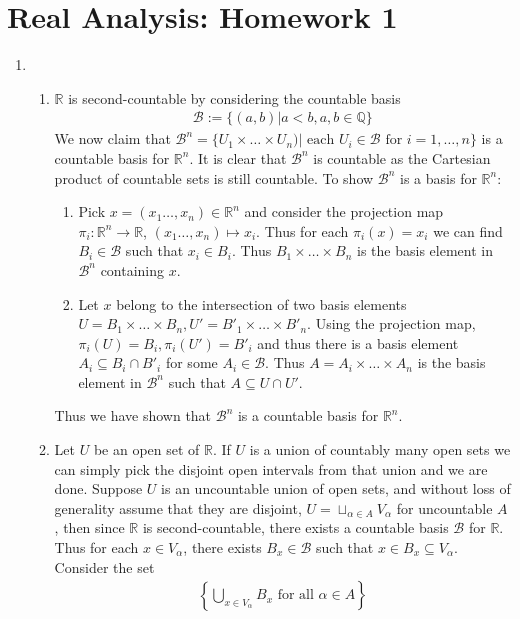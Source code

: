 \documentclass[a4paper,10pt]{article}
\theoremstyle{definition}
\begin{document}
\section*{Real Analysis: Homework 1}

\begin{enumerate}

\item
\begin{enumerate}
\item $\mathbb{R}$ is second-countable by considering the countable basis 
\begin{align*}
\mathcal{B}:=\{(a,b)| a<b, a,b \in \mathbb{Q}\}
\end{align*}
We now claim that $\mathcal{B}^n = \{U_1\times \ldots\times U_n)|\text{ each }U_i\in \mathcal{B}\text{ for }i=1,\ldots, n\}$ is a countable basis for $\mathbb{R}^n$. It is clear that $\mathcal{B}^n$ is countable as the Cartesian product of countable sets is still countable. To show $\mathcal{B}^n$ is a basis for $\mathbb{R}^n$:
\begin{enumerate}[(1)]
\item Pick $x = (x_1\ldots, x_n) \in \mathbb{R}^n$ and consider the projection map $\pi_i: \mathbb{R}^n \to \mathbb{R}$, $(x_1\ldots, x_n) \mapsto x_i$. Thus for each $\pi_i(x) = x_i$ we can find $B_i \in \mathcal{B}$ such that $x_i \in B_i$. Thus $B_1 \times \ldots \times B_n$ is the basis element in $\mathcal{B}^n$ containing $x$.
\item Let $x$ belong to the intersection of two basis elements $U = B_1 \times \ldots \times B_n, U' = B'_1 \times \ldots \times B'_n$. Using the projection map, $\pi_i(U) = B_i, \pi_i(U') = B'_i$ and thus there is a basis element $A_i \subseteq B_i \cap B'_i$ for some $A_i \in \mathcal{B}$. Thus $A = A_i \times \ldots \times A_n$ is the basis element in $\mathcal{B}^n$ such that $A \subseteq U \cap U'$.
\end{enumerate}
Thus we have shown that $\mathcal{B}^n$ is a countable basis for $\mathbb{R}^n$.



\item Let $U$ be an open set of $\mathbb{R}$. If $U$ is a union of countably many open sets we can simply pick the disjoint open intervals from that union and we are done. Suppose $U$ is an uncountable union of open sets, and without loss of generality assume that they are disjoint, $U = \sqcup_{\alpha \in A}V_\alpha$ for uncountable $A$, then since $\mathbb{R}$ is second-countable, there exists a countable basis $\mathcal{B}$ for $\mathbb{R}$. Thus for each $x \in V_\alpha$, there exists $B_x \in \mathcal{B}$ such that $x \in B_x \subseteq V_\alpha$. Consider the set 
\begin{align*}
\left\{\bigcup_{x\in V_\alpha} B_x \text{ for all }\alpha \in A\right\}
\end{align*}



\end{enumerate}
\end{enumerate}
\end{document}
